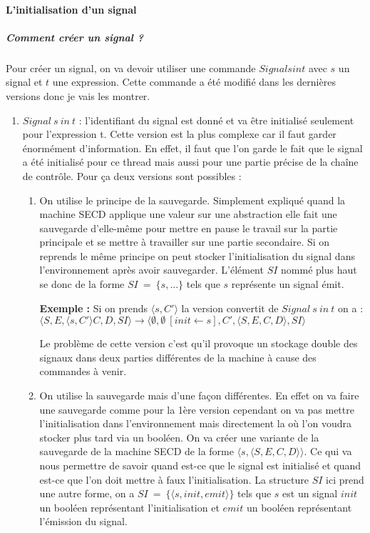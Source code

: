 \documentclass[10pt,a4paper]{article}
\begin{document}
						
						
				\paragraph{L'initialisation d'un signal}
					
					\subparagraph{Comment créer un signal ?}
					Pour créer un signal, on va devoir utiliser une commande $Signal s in t$ avec $s$ un signal et $t$ une expression. Cette commande a été modifié dans les dernières versions donc je vais les montrer.
					\smallbreak
					\begin{enumerate}
						\item $Signal~s~in~t$ : l'identifiant du signal est donné et va être initialisé seulement pour l'expression t. Cette version est la plus complexe car il faut garder énormément d'information. En effet, il faut que l'on garde le fait que le signal a été initialisé pour ce thread mais aussi pour une partie précise de la chaîne de contrôle. Pour ça deux versions sont possibles :
						\begin{enumerate}
							\item On utilise le principe de la sauvegarde. Simplement expliqué quand la machine SECD applique une valeur sur une abstraction elle fait une sauvegarde d'elle-même pour mettre en pause le travail sur la partie principale et se mettre à travailler sur une partie secondaire. Si on reprends le même principe on peut stocker l'initialisation du signal dans l'environnement après avoir sauvegarder. L'élément $SI$ nommé plus haut se donc de la forme $SI~=~\{s,...\}$ tels que $s$ représente un signal émit.
							\medbreak
								
							\textbf{Exemple :} Si on prends $\langle s,C'\rangle$ la version convertit de $Signal~s~in~t$ on a : 
							\\$\langle S,E,\langle s,C'\rangle C,D,SI\rangle \longrightarrow \langle \emptyset,\emptyset~[init \leftarrow s],C',\langle S,E,C,D\rangle,SI\rangle$  
							\medbreak
								
							Le problème de cette version c'est qu'il provoque un stockage double des signaux dans deux parties différentes de la machine à cause des commandes à venir.
								
							\item On utilise la sauvegarde mais d'une façon différentes. En effet on va faire une sauvegarde comme pour la 1ère version cependant on va pas mettre l'initialisation dans l'environnement mais directement la où l'on voudra stocker plus tard via un booléen. On va créer une variante de la sauvegarde de la machine SECD de la forme $\langle s,\langle S,E,C,D\rangle\rangle$. Ce qui va nous permettre de savoir quand est-ce que le signal est initialisé et quand est-ce que l'on doit mettre à faux l'initialisation. La structure $SI$ ici prend une autre forme, on a $SI~=~\{\langle s,init,emit\rangle\}$ tels que $s$ est un signal $init$ un booléen représentant l'initialisation et $emit$ un booléen représentant l'émission du signal.
							\medbreak
								

\end{enumerate}
\end{enumerate}
\end{document}
